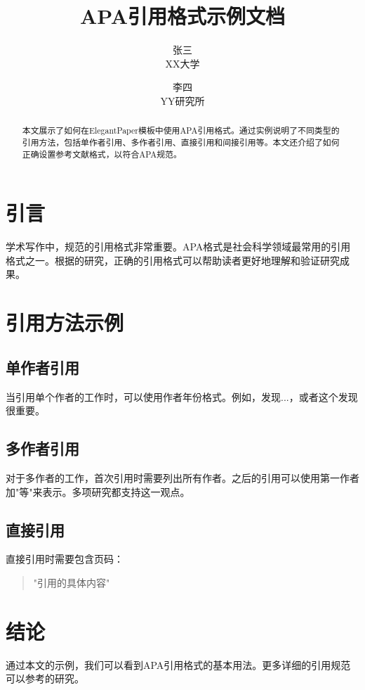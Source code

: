 \documentclass[lang=cn]{elegantpaper}
\title{APA引用格式示例文档}
\author{张三 \\ XX大学 \and 李四 \\ YY研究所}
\institute{\href{https://www.example.com}{示例研究组}}
\date{\zhdate{2024/03/21}}
\begin{document}
\maketitle

\begin{abstract}
本文展示了如何在ElegantPaper模板中使用APA引用格式。通过实例说明了不同类型的引用方法，包括单作者引用、多作者引用、直接引用和间接引用等。本文还介绍了如何正确设置参考文献格式，以符合APA规范。
\end{abstract}

\section{引言}

学术写作中，规范的引用格式非常重要。APA格式是社会科学领域最常用的引用格式之一\parencite{smith2020}。根据\textcite{johnson2019}的研究，正确的引用格式可以帮助读者更好地理解和验证研究成果。

\section{引用方法示例}

\subsection{单作者引用}

当引用单个作者的工作时，可以使用作者年份格式。例如，\textcite{smith2020}发现...，或者这个发现很重要\parencite{smith2020}。

\subsection{多作者引用}

对于多作者的工作，首次引用时需要列出所有作者\parencite{johnson2019}。之后的引用可以使用第一作者加"等"来表示。多项研究\parencite{smith2020,johnson2019,wilson2021}都支持这一观点。

\subsection{直接引用}

直接引用时需要包含页码：

\begin{quote}
"引用的具体内容"\parencite[p.~123]{smith2020}
\end{quote}

\section{结论}

通过本文的示例，我们可以看到APA引用格式的基本用法。更多详细的引用规范可以参考\textcite{wilson2021}的研究。

\printbibliography[heading=bibintoc,title=参考文献]
\end{document}
